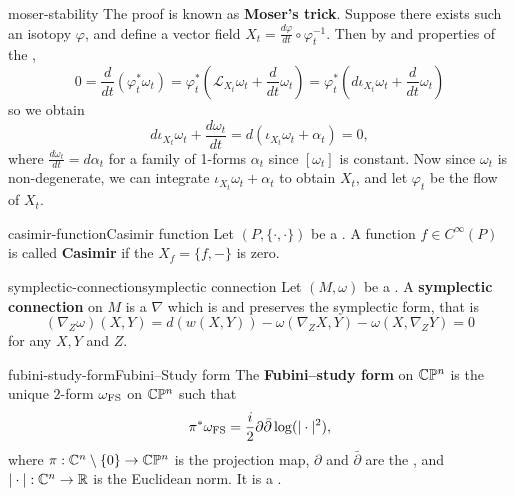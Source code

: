 \begin{example}{moser-stability}
    The proof is known as \textbf{Moser's trick}. Suppose there exists such an isotopy $\varphi$, and define a vector field $X_t = \frac{d \varphi}{d t} \circ \varphi_t^{-1}$. Then by  and properties of the ,
    \[ 0 = \frac{d}{dt} \left(\varphi_t^* \omega_t\right) = \varphi_t^* \left(\mathcal{L}_{X_t} \omega_t + \frac{d}{dt} \omega_t \right) = \varphi_t^* \left(d \iota_{X_t} \omega_t + \frac{d}{dt} \omega_t \right) \]
    so we obtain
    \[ d \iota_{X_t} \omega_t + \frac{d \omega_t}{dt} = d(\iota_{X_t} \omega_t + \alpha_t) = 0 , \]
    where $\frac{d \omega_t}{d t} = d \alpha_t$ for a family of 1-forms $\alpha_t$ since $[\omega_t]$ is constant. Now since $\omega_t$ is non-degenerate, we can integrate $\iota_{X_t} \omega_t + \alpha_t$ to obtain $X_t$, and let $\varphi_t$ be the flow of $X_t$.
\end{example}

\begin{topic}{casimir-function}{Casimir function}
    Let $(P, \{ \cdot, \cdot \})$ be a . A function $f \in C^\infty(P)$ is called \textbf{Casimir} if the  $X_f = \{ f, - \}$ is zero.
\end{topic}

\begin{topic}{symplectic-connection}{symplectic connection}
    Let $(M, \omega)$ be a . A \textbf{symplectic connection} on $M$ is a  $\nabla$ which is  and preserves the symplectic form, that is
    \[ (\nabla_Z \omega)(X, Y) = d(w(X, Y)) - \omega(\nabla_Z X, Y) - \omega(X, \nabla_Z Y) = 0 \]
    for any  $X, Y$ and $Z$.
\end{topic}

\begin{topic}{fubini-study-form}{Fubini--Study form}
    The \textbf{Fubini--study form} on $\mathbb{C} \mathbb{P}^n$ is the unique $2$-form $\omega_\textup{FS}$ on $\mathbb{C} \mathbb{P}^n$ such that
    \[ \pi^* \omega_\textup{FS} = \frac{i}{2} \partial \bar{\partial} \log (|\cdot|^2) , \]
    where $\pi : \mathbb{C}^n \setminus \{ 0 \} \to \mathbb{C} \mathbb{P}^n$ is the projection map, $\partial$ and $\bar{\partial}$ are the , and $|\cdot| : \mathbb{C}^n \to \mathbb{R}$ is the Euclidean norm. It is a .
\end{topic}

